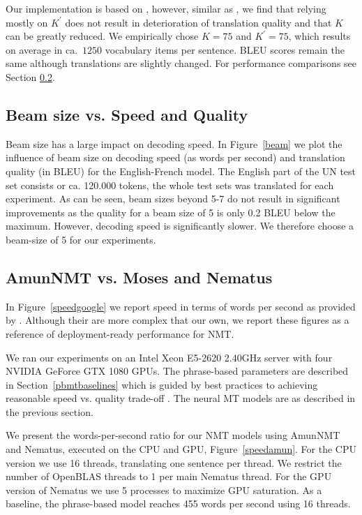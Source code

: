 \documentclass[11pt]{article}
\begin{document}
Our implementation is based on \cite{DBLP:conf/acl/JeanCMB15}, however, similar as \cite{DBLP:conf/acl/MiWI16}, we find that relying mostly on $K^{\prime}$  does not result in  deterioration of translation quality and that $K$ can be greatly reduced. We empirically chose $K=75$ and $K^{\prime}=75$, which results on average in ca.~$1250$ vocabulary items per sentence.  
BLEU scores remain the same although translations are slightly changed. For performance comparisons see Section \ref{comparespeed}.

\subsection{Beam size vs. Speed and Quality}

Beam size has a large impact on decoding speed. In Figure~\ref{beam} we plot the influence of beam size on decoding speed (as words per second) and translation quality (in BLEU) for the English-French model. The English part of the UN test set consists or ca. 120.000 tokens, the whole test sets was translated for each experiment. As can be seen, beam sizes beyond 5-7 do not result in significant improvements as the quality for a beam size of 5 is only 0.2 BLEU below the maximum. However, decoding speed is significantly slower. We therefore choose a beam-size of 5 for our experiments.  

\subsection{AmunNMT vs. Moses and Nematus}
\label{comparespeed}
In Figure~\ref{speedgoogle} we report speed in terms of words per second as provided by \cite{google}. Although their are more complex that our own, we report these figures as a reference of deployment-ready performance for NMT. 

We ran our experiments on an Intel Xeon E5-2620 2.40GHz server with four NVIDIA GeForce GTX 1080 GPUs. The phrase-based parameters are described in Section~\ref{pbmtbaselines} which is guided by best practices to achieving reasonable speed vs. quality trade-off \cite{junczys_mtsummit_2013}. The neural MT models are as described in the previous section.

We present the words-per-second ratio for our NMT models using AmunNMT and Nematus, executed on the CPU and GPU, Figure~\ref{speedamun}. For the CPU version we use 16 threads, translating one sentence per thread. We restrict the number of OpenBLAS threads to 1 per main Nematus thread. For the GPU version of Nematus we use 5 processes to maximize GPU saturation. As a baseline, the phrase-based model reaches 455 words per second using 16 threads. 
\end{document}
